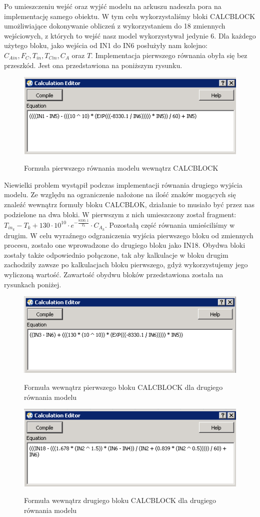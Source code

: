 Po umieszczeniu wejść oraz wyjść modelu na arkuszu nadeszła pora na implementację samego obiektu. W tym celu wykorzystaliśmy bloki CALCBLOCK umożliwiające dokonywanie obliczeń z wykorzystaniem do 18 zmiennych wejściowych, z których to wejść nasz model wykorzystywał jedynie 6. Dla każdego użytego bloku, jako wejścia od IN1 do IN6 posłużyły nam kolejno: $C_{Ain}, F_C, T_{in}, T_{Cin}, C_A$ oraz $T$. Implementacja pierwszego równania obyła się bez przeszkód. Jest ona przedstawiona na poniższym rysunku.

\begin{figure}[h!]
	\centering
	\includegraphics[width=.5\linewidth]{img/CALCBLOCK1.png}
	\label{ch1:calc1}
	\caption{Formuła pierwszego równania modelu wewnątrz CALCBLOCK}
\end{figure}

Niewielki problem wystąpił podczas implementacji równania drugiego wyjścia modelu. Ze względu na ograniczenie nałożone na ilość znaków mogących się znaleźć wewnątrz formuły bloku CALCBLOK, działanie to musiało być przez nas podzielone na dwa bloki. W pierwszym z nich umieszczony został fragment: $T_{in_k} - T_k + 130\cdot 10^{10}\cdot e^{-\frac{8330,1}{T_k}}\cdot C_{A_k}$. Pozostałą część równania umieściliśmy w drugim. W celu wyraźnego odgraniczenia wyjścia pierwszego bloku od zmiennych procesu, zostało one wprowadzone do drugiego bloku jako IN18. Obydwa bloki zostały także odpowiednio połączone, tak aby kalkulacje w bloku drugim zachodziły zawsze po kalkulacjach bloku pierwszego, gdyż wykorzystujemy jego wyliczoną wartość. Zawartość obydwu bloków przedstawiona została na rysunkach poniżej.

\begin{figure}[h!]
	\centering
	\includegraphics[width=.5\linewidth]{img/CALCBLOCK2.png}
	\label{ch1:calc2}
	\caption{Formuła wewnątrz pierwszego bloku CALCBLOCK dla drugiego równania modelu}
\end{figure}

\begin{figure}[h!]
	\centering
	\includegraphics[width=.5\linewidth]{img/CALCBLOCK3.png}
	\label{ch1:calc3}
	\caption{Formuła wewnątrz drugiego bloku CALCBLOCK dla drugiego równania modelu}
\end{figure}

